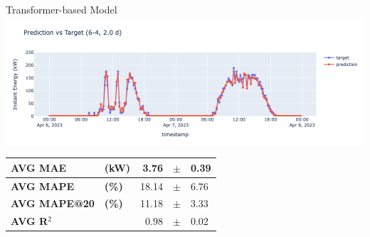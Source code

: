 \begin{frame}{Transformer-based Model}
	\centering
	\includegraphics[width=\textwidth]{sections/5_eval/imgs/trans/trans2dbuco1.png}

	\begin{table}[]
		\centering
		\begin{tabular}{ll|rcl}
			\textbf{AVG MAE}     & \textbf{(kW)} & 3.76  & $\pm$ & 0.39 \\
			\hline
			\textbf{AVG MAPE}    & \textbf{(\%)} & 18.14 & $\pm$ & 6.76 \\
			\hline
			\textbf{AVG MAPE@20} & \textbf{(\%)} & 11.18 & $\pm$ & 3.33 \\
			\hline
			\textbf{AVG R$^2$}   &               & 0.98  & $\pm$ & 0.02
		\end{tabular}
	\end{table}
\end{frame}


%    
%    
%         
